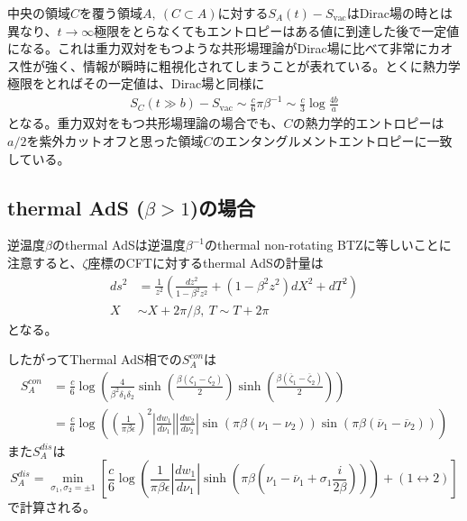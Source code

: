 中央の領域$C$を覆う領域$A,\ (C\subset A)$に対する$S_A(t)-S_\text{vac}$はDirac場の時とは異なり、$t\to\infty$極限をとらなくてもエントロピーはある値に到達した後で一定値になる。これは重力双対をもつような共形場理論がDirac場に比べて非常にカオス性が強く、情報が瞬時に粗視化されてしまうことが表れている。とくに熱力学極限をとればその一定値は、Dirac場と同様に
\begin{align}
S_C(t\gg b)-S_\text{vac} \sim \frac{c}{6}\pi\beta^{-1} \sim \frac{c}{3}\log\frac{4b}{a}
\end{align}
となる。重力双対をもつ共形場理論の場合でも、$C$の熱力学的エントロピーは$a/2$を紫外カットオフと思った領域$C$のエンタングルメントエントロピーに一致している。

\subsection{thermal AdS ($\beta>1$)の場合}
逆温度$\beta$のthermal AdSは逆温度$\beta^{-1}$のthermal non-rotating BTZに等しいことに注意すると、$\zeta$座標のCFTに対するthermal AdSの計量は
\begin{align}
ds^2&=\frac{1}{z^2}\left( \frac{dz^2}{1-\beta^2z^2}+\left(1-\beta^2z^2\right)dX^2+dT^2 \right)\\
X&\sim X+2\pi/\beta,\ T\sim T+2\pi
\end{align}
となる。

したがってThermal AdS相での$S_A^{con}$は
\begin{align}
S^{con}_A&=\frac{c}{6}\log \left( \frac{4}{\beta^2\delta_1\delta_2}\sinh\left(\frac{\beta(\zeta_1-\zeta_2)}{2} \right)\sinh\left(\frac{\beta(\overline{\zeta}_1-\overline{\zeta}_2)}{2} \right) \right)\\
&=\frac{c}{6}\log \left( \left(\frac{1}{\pi\beta\epsilon}\right)^2\left|\frac{dw_{1}}{d\nu_{1}}\right|\left|\frac{dw_{2}}{d\nu_{2}}\right|\sin\left(\pi\beta (\nu_1-\nu_2) \right)\sin\left(\pi\beta (\overline{\nu}_1-\overline{\nu}_2) \right)\right)
\end{align}
また$S^{dis}_A$は
\begin{equation}
S^{dis}_A=\min_{\sigma_1,\sigma_2=\pm 1}\left[\frac{c}{6}\log \left( \frac{1}{\pi\beta\epsilon}\left|\frac{dw_{1}}{d\nu_{1}}\right|\sinh\left(\pi\beta\left(\nu_1-\overline{\nu}_1+ \sigma_1 \frac{i}{2\beta}\right)\right)\right)+(1\leftrightarrow 2)\right]
\end{equation}
で計算される。

